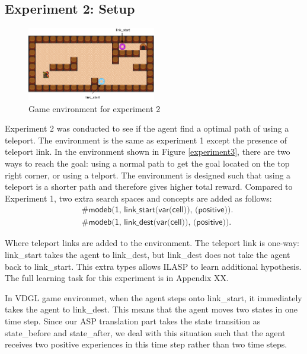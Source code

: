 
\subsection{Experiment 2: Setup}
\label{subsec:experiement2_setup}
\begin{figure}[!htb]
\centering
\includegraphics[width=0.5\textwidth]{./figures/experiment2_setup}
\caption{Game environment for experiment 2}
\label{experiment2}
\end{figure}
Experiment 2 was conducted to see if the agent find a optimal path of using a teleport. The environment is the same as experiment 1 except the presence of teleport link.
In the environment shown in Figure \ref{experiment3},
there are two ways to reach the goal: using a normal path to get the goal located on the top right corner, or using a telport.
The environment is designed such that using a teleport is a shorter path and therefore gives higher total reward.
Compared to Experiment 1, two extra search spaces and concepts are added as follows:
\begin{equation*}
\begin{split}
&\textsf{\#modeb(1, link\_start(var(cell)), (positive)).}\\
&\textsf{\#modeb(1, link\_dest(var(cell)), (positive)).}
\end{split}
\end{equation*}

Where teleport links are added to the environment. The teleport link is one-way: \textsf{link\_start} takes the agent to \textsf{link\_dest}, but \textsf{link\_dest} does not take the agent back to \textsf{link\_start}.
This extra types allows ILASP to learn additional hypothesis.
The full learning task for this experiment is in Appendix XX.

In VDGL game environmet, when the agent steps onto \textsf{link\_start}, it immediately takes the agent to \textsf{link\_dest}. This means that the agent moves two states in one time step.
Since our ASP translation part takes the state transition as \textsf{state\_before} and \textsf{state\_after}, 
we deal with this situation such that the agent receives two positive experiences in this time step rather than two time steps.

